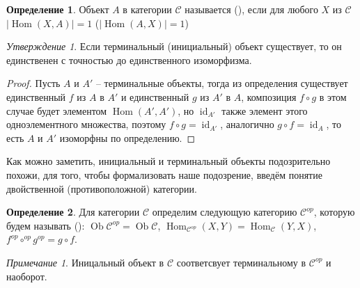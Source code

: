 \documentclass[a4paper]{article}
\theoremstyle{indented}
\theoremstyle{definition}
\newtheorem{defn}{Определение}
\theoremstyle{remark}
\newtheorem{remark}{Примечание}
\newtheorem{stat}{Утверждение}
\DeclareMathOperator{\id}{id}
\DeclareMathOperator{\Ob}{Ob}
\DeclareMathOperator{\Hom}{Hom}
\begin{document}
\begin{defn}
    Объект $A$ в категории $\mathcal{C}$ называется  (), если для любого $X$ из $\mathcal{C}$ $\vert \Hom (X, A)\vert=1$ ($\vert \Hom (A, X)\vert=1$)
\end{defn}
\begin{stat}
    Если терминальный (инициальный) объект существует, то он единственен с точностью до единственного изоморфизма.
\end{stat}
\begin{proof}
    Пусть $A$ и $A'$ -- терминальные объекты, тогда из определения существует единственный $f$ из $A$ в $A'$ и единственный $g$ из $A'$ в $A$, композиция $f\circ g$ в этом случае будет элементом $\Hom (A', A')$, но $\id_{A'}$ также элемент этого одноэлементного множества, поэтому $f\circ g = \id_{A'}$, аналогично $g\circ f = \id_{A}$, то есть $A$ и $A'$ изоморфны по определению.
\end{proof}
Как можно заметить, инициальный и терминальный объекты подозрительно похожи, для того, чтобы формализовать наше подозрение, введём понятие двойственной (противоположной) категории.
\begin{defn}
    Для категории $\mathcal{C}$ определим следующую категорию $\mathcal{C}^{op}$, которую будем называть  (): $\Ob\mathcal{C}^{op} = \Ob\mathcal{C}$, $\Hom _{\mathcal{C}^{op}}(X, Y)=\Hom _{\mathcal{C}}(Y, X)$, $f^{op}\circ ^{op}g^{op} = g\circ f$.
\end{defn}
\begin{remark}
    Иницальный объект в $\mathcal{C}$ соответсвует терминальному в $\mathcal{C}^{op}$ и наоборот.
\end{remark}
\end{document}
